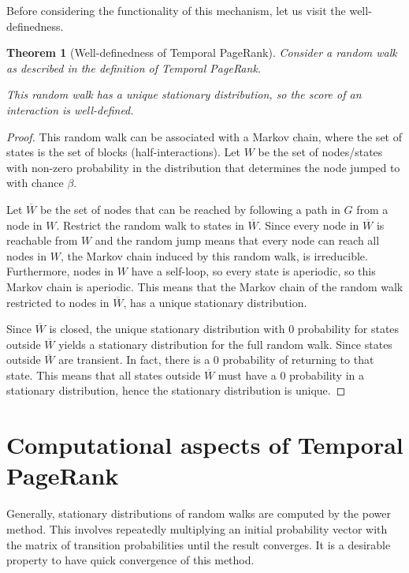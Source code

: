 \documentclass[a4paper,11pt]{book}
\newcommand{\ov}{\overline}
\newtheorem{theorem}{Theorem}
\theoremstyle{definition}
\begin{document}
Before considering the functionality of this mechanism, let us visit the well-definedness.

\begin{theorem}[Well-definedness of Temporal PageRank]
    Consider a random walk as described in the definition of Temporal PageRank.

    This random walk has a unique stationary distribution, so the score of an interaction is well-defined.
    \label{thm:well_defined}
\end{theorem}
\begin{proof}
    This random walk can be associated with a Markov chain, where the set of states is the set of
    blocks (half-interactions). Let $W$ be the set of nodes/states with non-zero probability in the distribution
    that determines the node jumped to with chance $\beta$.

    Let $\ov{W}$ be the set of nodes that can be reached by following a path in $G$ from a node
    in $W$. Restrict the random walk to states in $\ov{W}$. Since every node in $\ov{W}$ is reachable
    from $W$ and the random jump means that every node can reach all nodes in $W$, the Markov chain
    induced by this random walk, is irreducible. Furthermore, nodes in $W$ have a self-loop, so every
    state is aperiodic, so this Markov chain is aperiodic. This means that the Markov chain of the
    random walk restricted to nodes in $\ov{W}$, has a unique stationary distribution.

    Since $\ov{W}$ is closed, the unique stationary distribution with $0$ probability for states outside
    $\ov{W}$ yields a stationary distribution for the full random walk. Since states
    outside $\ov{W}$ are transient. In fact, there is a $0$ probability of returning to that
    state. This means that all states outside $\ov{W}$ must have a $0$ probability in a stationary
    distribution, hence the stationary distribution is unique.
\end{proof}


\section{Computational aspects of Temporal PageRank}

Generally, stationary distributions of random walks are computed by the power method. This involves repeatedly
multiplying an initial probability vector with the matrix of transition probabilities until
the result converges. It is a desirable property to have quick convergence of this method.
\end{document}
